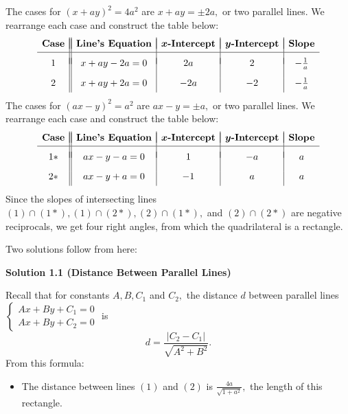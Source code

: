 \begin{enumerate}
The cases for $(x+ay)^2 = 4a^2$ are $x+ay = \pm2a,$ or two parallel lines. We rearrange each case and construct the table below:
 \[\begin{array}{c||c|c|c|c} & & & & \\ [-2.5ex] \textbf{Case} & \textbf{Line's Equation} & \boldsymbol{x}\textbf{-Intercept} & \boldsymbol{y}\textbf{-Intercept} & \textbf{Slope} \\ [0.5ex] \hline & & & & \\ [-1.5ex] 1 & x+ay-2a=0 & 2a & 2 & -\frac1a  \\ [2ex]  2 & x+ay+2a=0 & -2a & -2 & -\frac1a \\ [0.75ex] \end{array}\]The cases for $(ax-y)^2 = a^2$ are $ax-y=\pm a,$ or two parallel lines. We rearrange each case and construct the table below:
 \[\begin{array}{c||c|c|c|c} & & & & \\ [-2.5ex] \textbf{Case} & \textbf{Line's Equation} & \boldsymbol{x}\textbf{-Intercept} & \boldsymbol{y}\textbf{-Intercept} & \textbf{Slope} \\ [0.5ex] \hline & & & & \\ [-1.5ex] 1* & ax-y-a=0 & 1 & -a & a  \\ [2ex]  2* & ax-y+a=0 & -1 & a & a \\ [0.75ex] \end{array}\]Since the slopes of intersecting lines $(1)\cap(1*), (1)\cap(2*), (2)\cap(1*),$ and $(2)\cap(2*)$ are negative reciprocals, we get four right angles, from which the quadrilateral is a rectangle.

 Two solutions follow from here:

 



\textbf{Solution 1.1 (Distance Between Parallel Lines)}

Recall that for constants $A,B,C_1$ and $C_2,$ the distance $d$ between parallel lines$\begin{cases} Ax+By+C_1=0 \\ Ax+By+C_2=0 \end{cases}$ is 
 \[d=\frac{\left|C_2-C_1\right|}{\sqrt{A^2+B^2}}.\]From this formula:

 
            \begin{itemize}
        \item The distance between lines $(1)$ and $(2)$ is $\frac{4a}{\sqrt{1+a^2}},$ the length of this rectangle.
            \end{itemize}
            

\end{enumerate}
